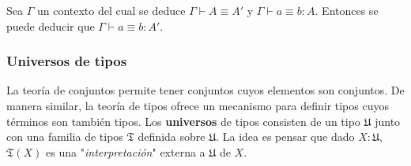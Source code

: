 \documentclass{article}
\begin{document}
        \begin{theorem}
            Sea $\Gamma$ un contexto del cual se deduce 
            $\Gamma \vdash A \equiv A'$ y $\Gamma \vdash a \equiv b : A$.
            Entonces se puede deducir que $\Gamma \vdash a \equiv b : A'$.
        \end{theorem}

    \subsubsection{Universos de tipos}
        La teoría de conjuntos permite tener conjuntos cuyos elementos son 
        conjuntos. De manera similar, la teoría de tipos ofrece un mecanismo
        para definir tipos cuyos términos son también tipos. Los 
        \textbf{universos} de tipos consisten de un tipo $\mathfrak{U}$ junto
        con una familia de tipos $\mathfrak{T}$ definida sobre $\mathfrak{U}$.
        La idea es pensar que dado $X : \mathfrak{U}$, $\mathfrak{T}(X)$ es
        una "\textit{interpretación}" externa a $\mathfrak{U}$ de $X$.
\end{document}
